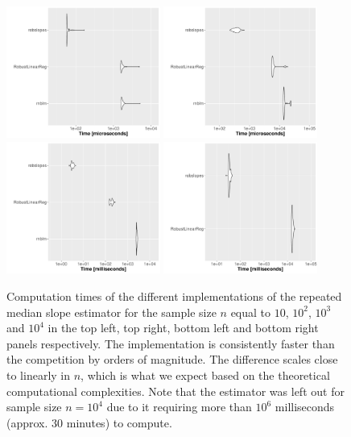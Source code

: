 \begin{figure}[h]
\includegraphics[width = 0.45\textwidth]{benchmark_RM_10.pdf}
\includegraphics[width = 0.45\textwidth]{benchmark_RM_100.pdf}
\vfill
\includegraphics[width = 0.45\textwidth]{benchmark_RM_1000.pdf}
\includegraphics[width = 0.45\textwidth]{benchmark_RM_10000.pdf}
\caption{Computation times of the different implementations of the repeated median slope estimator for the sample size $n$ equal to $10$, $10^2$, $10^3$ and $10^4$ in the top left, top right, bottom left and bottom right panels respectively. The  implementation is consistently faster than the competition by orders of magnitude. The difference scales close to linearly in $n$, which is what we expect based on the theoretical computational complexities.
Note that the  estimator was left out for sample size $n=10^4$ due to it requiring more than $10^6$ milliseconds (approx. 30 minutes) to compute.}
\label{fig:bench_RM}
\end{figure}

